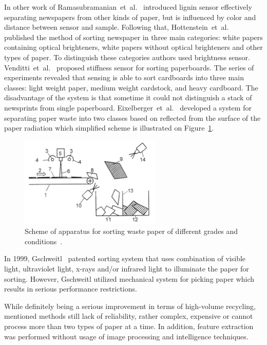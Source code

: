 \documentclass{lutmscthesis}[2010/09/22]
\begin{document}
In other work of Ramasubramanian~et~al.~\cite{Ramasubramanian:2005} introduced lignin sensor
effectively separating newspapers from other kinds of paper,
but is influenced by color and distance between sensor and sample.
Following that, Hottenstein~et~al.~\cite{Friberg:2000} published the method of sorting
newspaper in three main categories: white papers containing optical brighteners,
white papers without optical brighteners and other types of paper. To distinguish
these categories authors used brightness sensor. Venditti~et~al.~\cite{Venditti:2007}
proposed stiffness sensor for sorting paperboards. The series of
experiments revealed that sensing is able to sort cardboards
into three main classes: light weight paper, medium weight cardstock,
and heavy cardboard. The disadvantage
of the system is that sometime it could not distinguish a stack
of newsprints from single paperboard. Eixelberger~et~al.~\cite{Eixelberger:2003} developed a system
for separating paper waste into two classes based on reflected
from the surface of the paper radiation which simplified scheme
is illustrated on Figure~\ref{afig:eixelberger}.

\begin{figure}[htp]
  {\par\centering
  \includegraphics[width=0.60\textwidth]{eixelberger}
  \par}
  \caption{Scheme of apparatus for sorting waste paper
           of different grades and conditions~\cite{Eixelberger:2003}.}
  \label{afig:eixelberger}
\end{figure}

In 1999, Gschweitl~\cite{Gschweitl:1999} patented sorting system that uses
combination of visible light, ultraviolet light, x-rays and/or
infrared light to illuminate the paper for sorting. However,
Gschweitl utilized mechanical system for picking paper which
results in serious performance restrictions.

While definitely being a serious improvement in terms
of high-volume recycling, mentioned methods still lack
of reliability, rather complex, expensive or cannot process
more than two types of paper at a time. In addition, feature extraction
was performed without usage of image processing and
intelligence techniques.
\end{document}
